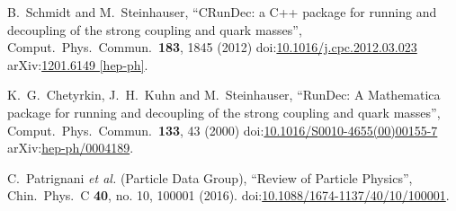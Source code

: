 \begin{thebibliography}{99}
B.~Schmidt and M.~Steinhauser, ``CRunDec: a C++ package for running and decoupling of the strong coupling and quark masses'', Comput.\ Phys.\ Commun.\ {\bf 183}, 1845 (2012) doi:\href{http://dx.doi.org/10.1016/j.cpc.2012.03.023}{10.1016/j.cpc.2012.03.023} arXiv:\href{https://arxiv.org/abs/1201.6149}{1201.6149 [hep-ph]}.

K.~G.~Chetyrkin, J.~H.~Kuhn and M.~Steinhauser, ``RunDec: A Mathematica package for running and decoupling of the strong coupling and quark masses'', Comput.\ Phys.\ Commun.\ {\bf 133}, 43 (2000) doi:\href{http://dx.doi.org/10.1016/S0010-4655(00)00155-7}{10.1016/S0010-4655(00)00155-7} arXiv:\href{https://arxiv.org/abs/hep-ph/0004189}{hep-ph/0004189}.

C.~Patrignani {\it et al.} (Particle Data Group), ``Review of Particle Physics'', Chin.\ Phys.\ C {\bf 40}, no. 10, 100001 (2016). doi:\href{http://dx.doi.org/10.1088/1674-1137/40/10/100001}{10.1088/1674-1137/40/10/100001}.


\end{thebibliography}
